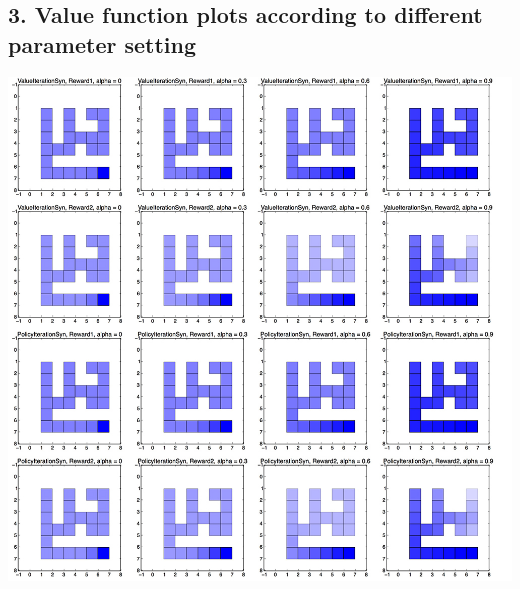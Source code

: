 \documentclass[12pt,a4paper,titlepage]{article}
\begin{document}
\subsection*{3. Value function plots according to different parameter setting}
\includegraphics[scale=0.5]{ValueFunctionPlot.jpg}
\end{document}
